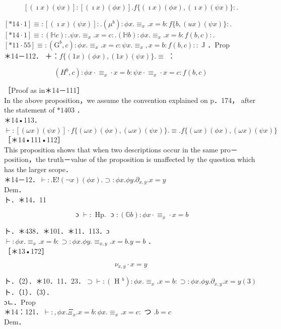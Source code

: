 \documentclass[10pt]{article}
\begin{document}
$$
[(\imath x)(\psi x)]:[(\imath x)(\phi x)] . f\{(\imath x)(\phi x),(\imath x)(\psi x)\}: .
$$

$[* 14 \cdot 1] \equiv:[(\imath x)(\psi x)]: .\left(\mu^{b}\right): \phi x . \equiv_{x} . x=b: f\{b,(u x)(\psi x)\}:$.\\
$[* 14 \cdot 1] \equiv:(\mathbb{H} c): . \psi x . \equiv_{x} . x=c: .(\mathbb{H} b): \phi x . \equiv_{x} . x=b: f(b, c):$.\\
$[* 11 \cdot 55] \equiv:\left(\mathrm{G}^{b}, c\right): \phi x . \equiv_{x} . x=c: \psi x . \equiv_{x}, x=b: f(b, c)::$ J ．Prop\\
＊14－112． ＋：$f\{(1 x)(\phi x),(1 x)(\psi x)\} . \equiv$ ：

$$
\left(H^{b}, c\right): \phi x \cdot \equiv_{x} \cdot x=b: \psi x \cdot \equiv_{x} \cdot x=c: f(b, c)
$$

［Proof as in＊14－111］\\
In the above proposition，we assume the convention explained on p．174， after the statement of $* 1403$ ．\\
＊14•113．$\vdash:[(\omega x)(\psi x)] \cdot f\{(\omega x)(\phi x),(\omega x)(\psi x)\} . \equiv . f\{(\omega x)(\phi x),(\omega x)(\psi x)\}$\\
［＊14•111•112］\\
This proposition shows that when two descriptions occur in the same pro－ position，the truth－value of the proposition is unaffected by the question which has the larger scope．\\
＊14－12．$\vdash: . \mathrm{E}!(\neg x)(\phi x) . \supset: \phi x . \phi y . \partial_{x, y} . x=y$\\
Dem．\\
ト．＊14．11


\begin{equation*}
\text { ɔ } \vdash: \text { Hp. } \text { ɔ }:(\mathbb{G} b): \phi x \cdot \equiv_{x} \cdot x=b \tag{1}
\end{equation*}


ト．＊438．＊101．＊11．113．ɔ\\
$\vdash: \phi x . \equiv_{x} . x=b: \supset: \phi x . \phi y . \equiv_{x, y} . x=b . y=b$ ．\\
［＊13•172］


\begin{equation*}
\nu_{x, y} \cdot x=y \tag{2}
\end{equation*}


ト．（2）．＊10．11．23．$\supset \vdash:\left(\right.$ H $\left.^{b}\right): \phi x . \equiv_{x} . x=b: \supset: \phi x . \phi y . \partial_{x, y} . x=y(3)$\\
ト．（1）．（3）．\\
ɔㄴ．Prop\\
＊14：121．$\vdash:, \phi x . \Xi_{x} . x=b: \phi x . \equiv_{x} . x=c:$ つ $. b=c$\\
Dem．
\end{document}
